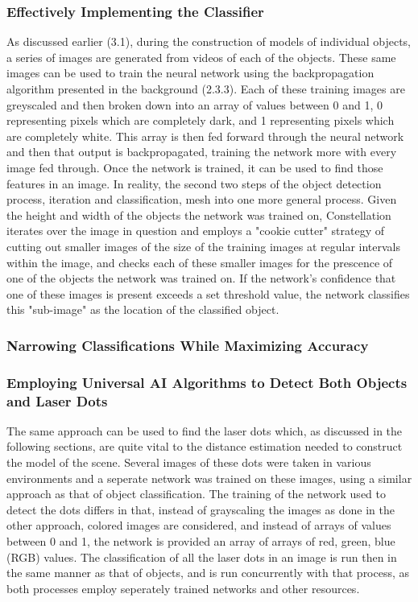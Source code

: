 \subsubsection{Effectively Implementing the Classifier}
As discussed earlier (3.1), during the construction of models of individual objects, a series of images are generated from videos of each of the objects. These same images can be used to train the neural network using the backpropagation algorithm presented in the background (2.3.3). Each of these training images are greyscaled and then broken down into an array of values between 0 and 1, 0 representing pixels which are completely dark, and 1 representing pixels which are completely white. This array is then fed forward through the neural network and then that output is backpropagated, training the network more with every image fed through. Once the network is trained, it can be used to find those features in an image. In reality, the second two steps of the object detection process, iteration and classification, mesh into one more general process. Given the height and width of the objects the network was trained on, Constellation iterates over the image in question and employs a "cookie cutter" strategy of cutting out smaller images of the size of the training images at regular intervals within the image, and checks each of these smaller images for the prescence of one of the objects the network was trained on. If the network's confidence that one of these images is present exceeds a set threshold value, the network classifies this "sub-image" as the location of the classified object.

\subsubsection{Narrowing Classifications While Maximizing Accuracy}

\subsubsection{Employing Universal AI Algorithms to Detect Both Objects and Laser Dots}
The same approach can be used to find the laser dots which, as discussed in the following sections, are quite vital to the distance estimation needed to construct the model of the scene. Several images of these dots were taken in various environments and a seperate network was trained on these images, using a similar approach as that of object classification. The training of the network used to detect the dots differs in that, instead of grayscaling the images as done in the other approach, colored images are considered, and instead of arrays of values between 0 and 1, the network is provided an array of arrays of red, green, blue (RGB) values. The classification of all the laser dots in an image is run then in the same manner as that of objects, and is run concurrently with that process, as both processes employ seperately trained networks and other resources.